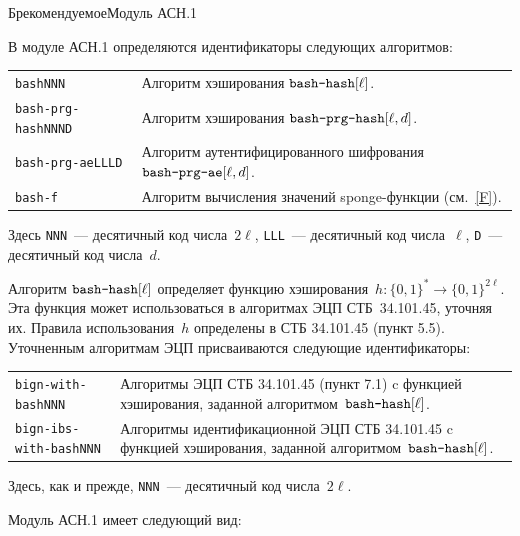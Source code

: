\begin{appendix}{Б}{рекомендуемое}{Модуль АСН.1}
\label{ASN}

\mbox{}

В модуле АСН.1 определяются идентификаторы следующих алгоритмов:
\begin{center}
\begin{tabular}{p{3.6cm}p{12.7cm}}
\texttt{bashNNN} &
Алгоритм хэширования $\texttt{bash-hash}[\ell]$.\\
%
\texttt{bash-prg-hashNNND} &
Алгоритм хэширования $\texttt{bash-prg-hash}[\ell,d]$.\\
%
\texttt{bash-prg-aeLLLD} &
Алгоритм аутентифицированного шифрования $\texttt{bash-prg-ae}[\ell,d]$.\\
%
\texttt{bash-f}  &
Алгоритм вычисления значений sponge-функции (см.~\ref{F}).\\
\end{tabular}
\end{center}

Здесь \texttt{NNN}~--- десятичный код числа~$2\ell$, 
\texttt{LLL}~--- десятичный код числа~$\ell$, 
\texttt{D}~--- десятичный код числа~$d$.

Алгоритм $\texttt{bash-hash}[\ell]$ определяет функцию 
хэширования~$h\colon \{0,1\}^*\to\{0,1\}^{2\ell}$. 
Эта функция может использоваться в алгоритмах 
ЭЦП СТБ~34.101.45, уточняя их.
%
Правила использования~$h$ определены в СТБ 34.101.45 (пункт 5.5).
%
Уточненным алгоритмам ЭЦП присваиваются следующие идентификаторы:
\begin{center}
\begin{tabular}{p{4.4cm}p{12.0cm}}
\texttt{bign-with-bashNNN} &
Алгоритмы ЭЦП СТБ 34.101.45 (пункт 7.1)
c функцией хэширования, заданной алгоритмом~$\texttt{bash-hash}[\ell]$.\\
%
\texttt{bign-ibs-with-bashNNN} &
Алгоритмы идентификационной ЭЦП СТБ 34.101.45
c функцией хэширования, заданной алгоритмом~$\texttt{bash-hash}[\ell]$.\\
\end{tabular}
\end{center}

Здесь, как и прежде, \texttt{NNN}~--- десятичный код числа~$2\ell$.

Модуль АСН.1 имеет следующий вид:



\end{appendix}
